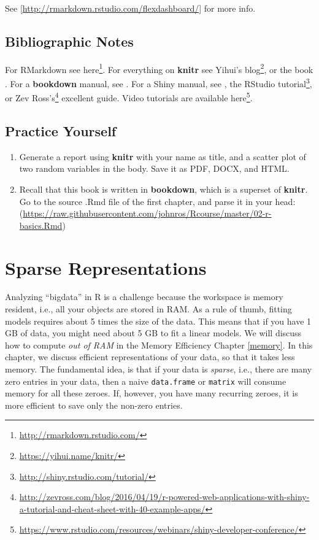 \documentclass[]{book}
\renewcommand{\href}[2]{#2\footnote{\url{#1}}}
\theoremstyle{definition}
\theoremstyle{definition}
\theoremstyle{definition}
\theoremstyle{remark}
\begin{document}
See {[}\url{http://rmarkdown.rstudio.com/flexdashboard/}{]} for more info.

\hypertarget{bibliographic-notes-11}{%
\section{Bibliographic Notes}\label{bibliographic-notes-11}}

For RMarkdown see \href{http://rmarkdown.rstudio.com/}{here}.
For everything on \textbf{knitr} see \href{https://yihui.name/knitr/}{Yihui's blog}, or the book \citet{xie2015dynamic}.
For a \textbf{bookdown} manual, see \citet{xie2016bookdown}.
For a Shiny manual, see \citet{shiny}, the \href{http://shiny.rstudio.com/tutorial/}{RStudio tutorial}, or \href{http://zevross.com/blog/2016/04/19/r-powered-web-applications-with-shiny-a-tutorial-and-cheat-sheet-with-40-example-apps/}{Zev Ross's} excellent guide.
Video tutorials are available \href{https://www.rstudio.com/resources/webinars/shiny-developer-conference/}{here}.

\hypertarget{practice-yourself-9}{%
\section{Practice Yourself}\label{practice-yourself-9}}

\begin{enumerate}
\def\labelenumi{\arabic{enumi}.}
\item
  Generate a report using \textbf{knitr} with your name as title, and a scatter plot of two random variables in the body. Save it as PDF, DOCX, and HTML.
\item
  Recall that this book is written in \textbf{bookdown}, which is a superset of \textbf{knitr}. Go to the source .Rmd file of the first chapter, and parse it in your head:
  (\url{https://raw.githubusercontent.com/johnros/Rcourse/master/02-r-basics.Rmd})
\end{enumerate}

\hypertarget{sparse}{%
\chapter{Sparse Representations}\label{sparse}}

Analyzing ``bigdata'' in R is a challenge because the workspace is memory resident, i.e., all your objects are stored in RAM.
As a rule of thumb, fitting models requires about 5 times the size of the data.
This means that if you have 1 GB of data, you might need about 5 GB to fit a linear models.
We will discuss how to compute \emph{out of RAM} in the Memory Efficiency Chapter \ref{memory}.
In this chapter, we discuss efficient representations of your data, so that it takes less memory.
The fundamental idea, is that if your data is \emph{sparse}, i.e., there are many zero entries in your data, then a naive \texttt{data.frame} or \texttt{matrix} will consume memory for all these zeroes.
If, however, you have many recurring zeroes, it is more efficient to save only the non-zero entries.
\end{document}
